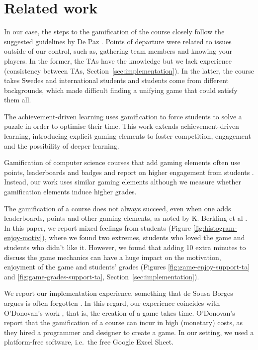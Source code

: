 \documentclass[sigconf]{acmart}
\begin{document}
\hypertarget{related-work}{%
\section{Related work}\label{related-work}}

In our case, the steps to the gamification of the course closely follow
the suggested guidelines by De Paz \citep{gamification-thesis}. Points
of departure were related to issues outside of our control, such as,
gathering team members and knowing your players. In the former, the TAs
have the knowledge but we lack experience (consistency between TAs,
Section~\ref{sec:implementation}). In the latter, the course takes
Swedes and international students and students come from different
backgrounds, which made difficult finding a unifying game that could
satisfy them all.

The achievement-driven learning \citep{wrigstad2017mastery} uses
gamification to force students to solve a puzzle in order to optimise
their time. This work extends achievement-driven learning, introducing
explicit gaming elements to foster competition, engagement and the
possibility of deeper learning.

Gamification of computer science courses that add gaming elements often
use points, leaderboards and badges and report on higher engagement from
students
\citep{eng-engineering-gamification, freitas-twice, todor, Villagrasa, ODonovan}.
Instead, our work uses similar gaming elements although we measure
whether gamification elements induce higher grades.

The gamification of a course does not always succeed, even when one adds
leaderboards, points and other gaming elements, as noted by K. Berkling
et al \citep{Berkling}. In this paper, we report mixed feelings from
students (Figure \ref{fig:histogram-enjoy-motiv}), where we found two
extremes, students who loved the game and students who didn't like it.
However, we found that adding 10 extra minutes to discuss the game
mechanics can have a huge impact on the motivation, enjoyment of the
game and students' grades (Figures \ref{fig:game-enjoy-support-ta} and
\ref{fig:game-grades-support-ta}, Section~\ref{sec:implementation}).

We report our implementation experience, something that de Sousa Borges
argues is often forgotten
\citep{deSousaBorges:2014:SMG:2554850.2554956}. In this regard, our
experience coincides with O'Donovan's work \citep{ODonovan}, that is,
the creation of a game takes time. O'Donovan's report that the
gamification of a course can incur in high (monetary) costs, as they
hired a programmer and designer to create a game. In our setting, we
used a platform-free software, i.e.~the free Google Excel Sheet.
\end{document}
